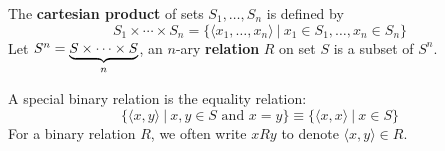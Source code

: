 \documentclass[english, 11pt]{article}
\begin{document}
  \begin{defn}\label{cartesian product}
  The \textbf{cartesian product} of sets $S_1,\ldots,S_n$ is defined by
  \[ S_1 \times \cdots \times S_n = \{ \langle x_1, \ldots, x_n \rangle \ | \ x_1 \in S_1, \ldots, x_n \in S_n \} \]
  Let $S^n = \underbrace{S \times \cdots \times S}_n$, an $n$-ary \textbf{relation} $R$ on set $S$ is a subset of $S^n$.
  \end{defn}

  \begin{exmp}
    A special binary relation is the equality relation:
    \[ \{\langle x , y \rangle \ | \ x,y \in S \mbox{ \ and \ } x= y \} \equiv \{ \langle x , x \rangle \ | \ x \in S \} \]
    For a binary relation $R$, we often write $xRy$ to denote $\langle x,y \rangle \in R$.
  \end{exmp}
\end{document}
